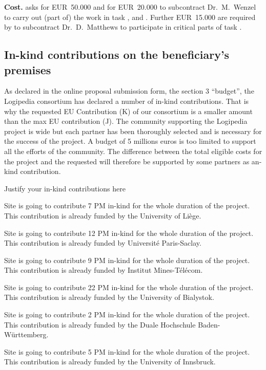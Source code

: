{\bf Cost.}  asks for
EUR~50.000 and  for EUR~20.000 to subcontract Dr.\ M.\ Wenzel to
carry out (part of) the work in task
,  and
. Further EUR~15.000 are required
by  to subcontract Dr.\ D.\ Matthews to participate in
critical parts of task .

\subsection*{In-kind contributions on the beneficiary’s premises}

As declared in the online proposal submission form, the section 3
``budget'', the Logipedia consortium has declared a number of in-kind
contributions. That is why the requested EU Contribution (K) of our
consortium is a smaller amount than the max EU contribution (J). The
community supporting the Logipedia project is wide but each partner
has been thoroughly selected and is necessary for the success of the
project. A budget of 5 millions euros is too limited to support all
the efforts of the community. The difference between the total
eligible costs for the project and the requested will therefore be
supported by some partners as an-kind contribution.

{\color{red} Justify your in-kind contributions here}

Site  is going to contribute 7 PM in-kind for the whole duration of the project.
This contribution is already funded by the University of Liège.

Site  is going to contribute 12 PM in-kind for the whole duration of the project.
This contribution is already funded by Université Paris-Saclay.

Site  is going to contribute 9 PM in-kind for the whole duration of the project.
This contribution is already funded by Institut Mines-Télécom.

Site  is going to contribute 22 PM in-kind for the whole duration of the project.
This contribution is already funded by the University of Bialystok.

Site  is going to contribute 2 PM in-kind for the whole duration of the project.
This contribution is already funded by the Duale Hochschule Baden-Württemberg.

Site  is going to contribute 5 PM in-kind for the whole duration of the project.
This contribution is already funded by the University of Innsbruck.


